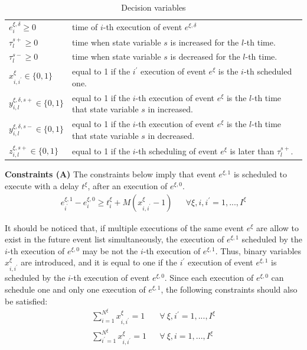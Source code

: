 \documentclass[]{interact}
\theoremstyle{plain}%
\theoremstyle{definition}
\theoremstyle{remark}
\begin{document}
\begin{table}[h]
	\begin{tabular}{ll}
		$e^{\xi,\delta}_i\ge 0$ 	& time of $i$-th execution of event $e^{\xi,\delta}$\\
		$\tau^{s+}_{l}\ge 0$ 			& time when state variable $s$ is increased for the $l$-th time.  \\
		$\tau^{s-}_{l}\ge 0$ 			& time when state variable $s$ is decreased for the $l$-th time. \\
		$x^{\xi}_{i,i^{'}}\in \{0,1\}$ 	& equal to 1 if the $i^{'}$ execution of event $e^{\xi}$ is the $i$-th scheduled one. \\
		$y^{\xi,\delta,s+}_{i,l}\in \{0,1\}$ & equal to 1 if the $i$-th execution of event $e^{\xi}$ is the $l$-th time that state variable $s$ in increased.\\
		$y^{\xi,\delta,s-}_{i,l}\in \{0,1\}$ &equal to 1 if the $i$-th execution of event $e^{\xi}$ is the $l$-th time that state variable $s$ in decreased.\\
		$z^{\xi,s+}_{i,l}\in \{0,1\}$ & equal to 1 if the $i$-th scheduling of event $e^{\xi}$ is later than $\tau^{s+}_{l}$.\\
	\end{tabular}
\caption{Decision variables}
\end{table}


\textbf{Constraints (A)} The constraints below imply that event $e^{\xi,1}$ is scheduled to execute with a delay $t^{\xi}$, after an execution of $e^{\xi,0}$. 
\begin{eqnarray}
e^{\xi,1}_{i^{'}} - e^{\xi,0}_{i} \ge t^{\xi}_{i} +M(x^{\xi}_{i,i^{'}}-1) && \forall \xi, i, i ^{'}=1,...,I^{\xi}\label{eq::A1}
\end{eqnarray}

It should be noticed that, if multiple executions of the same event $e^{\xi}$ are allow to exist in the future event list simultaneously, the execution of $e^{\xi,1}$ scheduled by the $i$-th execution of $e^{\xi,0}$ may be not the $i$-th execution of $e^{\xi,1}$. Thus, binary variables $x^{\xi}_{i,i^{'}}$ are introduced, and it is equal to one if the $i^{'}$ execution of event $e^{\xi,1}$ is scheduled by the $i$-th execution of event $e^{\xi,0}$. Since each execution of $e^{\xi,0}$ can schedule one and only one execution of $e^{\xi,1}$, the following constraints should also be satisfied:
\begin{eqnarray}
\sum_{i=1}^{N^{\xi}} x^{\xi}_{i,i^{'}} = 1&& \forall\ \xi, i^{'}=1,...,I^{\xi}\\
\sum_{i^{'}=1}^{N^{\xi}} x^{\xi}_{i,i^{'}} = 1 && \forall\ \xi,i=1,...,I^{\xi}
\end{eqnarray}
\end{document}
